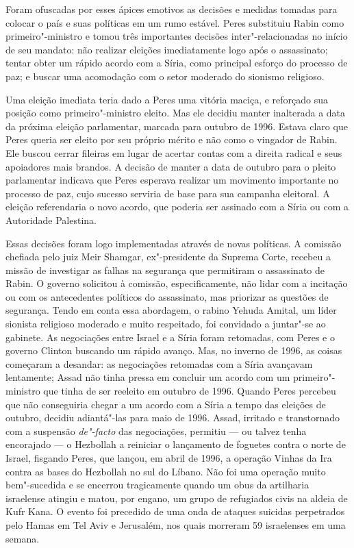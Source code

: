 Foram ofuscadas por esses ápices emotivos as decisões e medidas tomadas
para colocar o país e suas políticas em um rumo estável. Peres
substituiu Rabin como primeiro"-ministro e tomou três importantes
decisões inter"-relacionadas no início de seu mandato: não realizar
eleições imediatamente logo após o assassinato; tentar obter um rápido
acordo com a Síria, como principal esforço do processo de paz; e buscar
uma acomodação com o setor moderado do sionismo religioso.

Uma eleição imediata teria dado a Peres uma vitória maciça, e
reforçado sua posição como primeiro"-ministro eleito. Mas ele decidiu
manter inalterada a data da próxima eleição parlamentar, marcada para
outubro de 1996. Estava claro que Peres queria ser eleito por seu
próprio mérito e não como o vingador de Rabin. Ele buscou cerrar
fileiras em lugar de acertar contas com a direita radical e seus
apoiadores mais brandos. A decisão de manter a data de outubro para o
pleito parlamentar indicava que Peres esperava realizar um
movimento importante no processo de paz, cujo sucesso serviria de base para sua campanha eleitoral. A eleição referendaria o novo acordo, que poderia ser
assinado com a Síria ou com a Autoridade Palestina.

Essas decisões foram logo implementadas através de novas políticas. A
comissão chefiada pelo juiz Meir Shamgar, ex"-presidente da Suprema
Corte, recebeu a missão de investigar as falhas na segurança que
permitiram o assassinato de Rabin. O governo solicitou à comissão,
especificamente, não lidar com a incitação ou com os antecedentes
políticos do assassinato, mas priorizar as questões de segurança.
Tendo em conta essa abordagem, o rabino Yehuda Amital, um líder sionista
religioso moderado e muito respeitado, foi convidado a juntar"-se ao
gabinete. As negociações entre Israel e a Síria foram retomadas, com
Peres e o governo Clinton buscando um rápido avanço. Mas, no inverno de
1996, as coisas começaram a desandar: as negociações retomadas com a
Síria avançavam lentamente; Assad não tinha pressa em concluir um acordo
com um primeiro"-ministro que tinha de ser reeleito em outubro de 1996.
Quando Peres percebeu que não conseguiria chegar a um acordo com a Síria
a tempo das eleições de outubro, decidiu adiantá"-las para maio de 1996.
Assad, irritado e transtornado com a suspensão \textit{de"-facto} das
negociações, permitiu --- ou talvez tenha encorajado --- o Hezbollah a
reiniciar o lançamento de foguetes contra o norte de Israel, fisgando
Peres, que lançou, em abril de 1996, a operação Vinhas da Ira contra
as bases do Hezbollah no sul do Líbano. Não foi uma operação muito bem"-sucedida
e se encerrou tragicamente quando um obus da artilharia
israelense atingiu e matou, por engano, um grupo de refugiados civis na
aldeia de Kufr Kana. O evento foi precedido de uma onda de ataques
suicidas perpetrados pelo Hamas em Tel Aviv e Jerusalém, nos quais
morreram 59 israelenses em uma semana.

